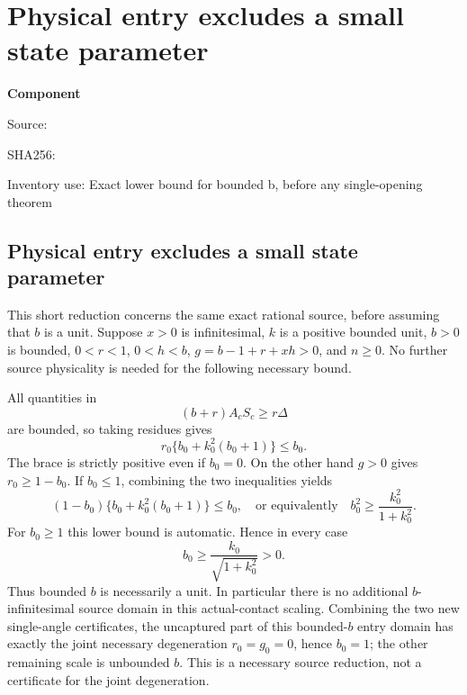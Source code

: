 \chapter{Physical entry excludes a small state parameter}
\label{component:p7294aae40ee2}
\noindent\textbf{Component }\par
{\small\noindent Source: \par}
{\small\noindent SHA256: \par}
{\small\noindent Inventory use: Exact lower bound for bounded b, before any single-opening theorem\par}
\medskip
\section{Physical entry excludes a small state parameter}
\label{p7294aae40ee2:sec:c2-bounded-state-entry}

This short reduction concerns the same exact rational source, before
assuming that $b$ is a unit.  Suppose $x>0$ is infinitesimal, $k$ is
a positive bounded unit, $b>0$ is bounded, $0<r<1$, $0<h<b$,
$g=b-1+r+xh>0$, and $n\geq0$.  No further source physicality is
needed for the following necessary bound.

All quantities in
\[
             (b+r)A_cS_c\geq r\Delta
\]
are bounded, so taking residues gives
\[
 r_0\{b_0+k_0^2(b_0+1)\}\leq b_0.
\]
The brace is strictly positive even if $b_0=0$.  On the other hand
$g>0$ gives $r_0\geq1-b_0$.  If $b_0\leq1$, combining the two
inequalities yields
\[
 (1-b_0)\{b_0+k_0^2(b_0+1)\}\leq b_0,
 \quad\text{or equivalently}\quad
              b_0^2\geq\frac{k_0^2}{1+k_0^2}.
\]
For $b_0\geq1$ this lower bound is automatic.  Hence in every case
\[
                b_0\geq\frac{k_0}{\sqrt{1+k_0^2}}>0.
\]
Thus bounded $b$ is necessarily a unit.  In particular there is no
additional $b$-infinitesimal source domain in this actual-contact
scaling.  Combining the two new single-angle certificates, the
uncaptured part of this bounded-$b$ entry domain has exactly the
joint necessary degeneration $r_0=g_0=0$, hence $b_0=1$; the other
remaining scale is unbounded $b$.  This is a necessary source
reduction, not a certificate for the joint degeneration.
